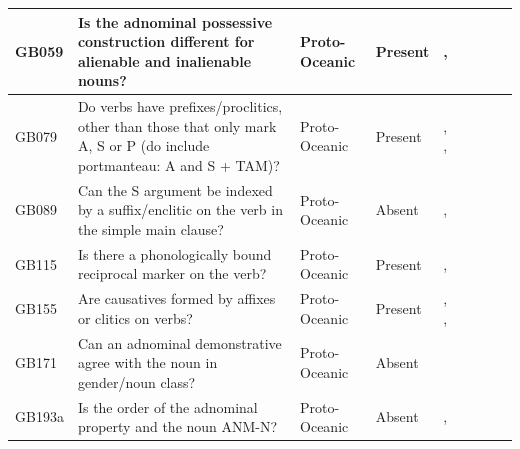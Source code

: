 \documentclass[a4paper,10pt]{article} %
\begin{document}
\begin{landscape}
\begin{longtable}{| p{2cm}| p{3cm}| p{2.5cm}|p{2cm}|p{2cm}|p{2cm}|p{2cm}|p{2cm}|p{2cm}|}
GB059&Is the adnominal possessive construction different for alienable and inalienable nouns?&Proto-Oceanic&Present&\citet[492, 511-512]{ross2004morphosyntactic}, \citet[69]{lynchrosscrowley_proto_grammar_oceanic}& \cellcolor{hedvig_lightgreen!50}{True Positive} & \cellcolor{hedvig_yellow!50}{Half} & \cellcolor{hedvig_lightgreen!50}{True Positive} & \cellcolor{hedvig_yellow!50}{Half} \\ \hline
GB079&Do verbs have prefixes/proclitics, other than those that only mark A, S or P (do include portmanteau: A and S + TAM)?&Proto-Oceanic&Present&\citet[142]{pawley1973some}, \citet[292]{ross2007two}, \citet[83]{lynchrosscrowley_proto_grammar_oceanic}& \cellcolor{hedvig_lightgreen!50}{True Positive} & \cellcolor{hedvig_yellow!50}{Half} & \cellcolor{hedvig_lightgreen!50}{True Positive} & \cellcolor{hedvig_yellow!50}{Half} \\ \hline
GB089&Can the S argument be indexed by a suffix/enclitic on the verb in the simple main clause?&Proto-Oceanic&Absent&\citet[498-499]{ross2004morphosyntactic}, \citet[83]{lynchrosscrowley_proto_grammar_oceanic}& \cellcolor{hedvig_lightgreen!50}{True Negative} & \cellcolor{hedvig_yellow!50}{Half} & \cellcolor{hedvig_yellow!50}{True Negative} & \cellcolor{hedvig_yellow!50}{Half} \\ \hline
GB115&Is there a phonologically bound reciprocal marker on the verb?&Proto-Oceanic&Present&\citet[172]{pawley1973some}, \citet[495, 513]{ross2004morphosyntactic}& \cellcolor{hedvig_lightgreen!50}{True Positive} & \cellcolor{hedvig_yellow!50}{Half} & \cellcolor{hedvig_lightgreen!50}{True Positive} & \cellcolor{hedvig_yellow!50}{Half} \\ \hline
GB155&Are causatives formed by affixes or clitics on verbs?&Proto-Oceanic&Present&\citet[74, 83]{lynchrosscrowley_proto_grammar_oceanic}, \citet[130]{pawley1973some}, \citet[344]{evans2003study}& \cellcolor{hedvig_lightgreen!50}{True Positive} & \cellcolor{hedvig_yellow!50}{Half} & \cellcolor{hedvig_lightgreen!50}{True Positive} & \cellcolor{hedvig_yellow!50}{False Negative} \\ \hline
GB171&Can an adnominal demonstrative agree with the noun in gender/noun class?&Proto-Oceanic&Absent&\citet[498]{ross2004morphosyntactic}& \cellcolor{hedvig_lightgreen!50}{True Negative} & \cellcolor{hedvig_yellow!50}{Half} & \cellcolor{hedvig_yellow!50}{True Negative} & \cellcolor{hedvig_yellow!50}{Half} \\ \hline
GB193a&Is the order of the adnominal property and the noun ANM-N?&Proto-Oceanic&Absent&\citet[497]{ross2004morphosyntactic}, \citet[74]{lynchrosscrowley_proto_grammar_oceanic}& \cellcolor{hedvig_lightgreen!50}{True Negative} & \cellcolor{hedvig_yellow!50}{Half} & \cellcolor{hedvig_yellow!50}{True Negative} & \cellcolor{hedvig_yellow!50}{Half} \\ \hline

\end{longtable}
\end{landscape}
\end{document}
